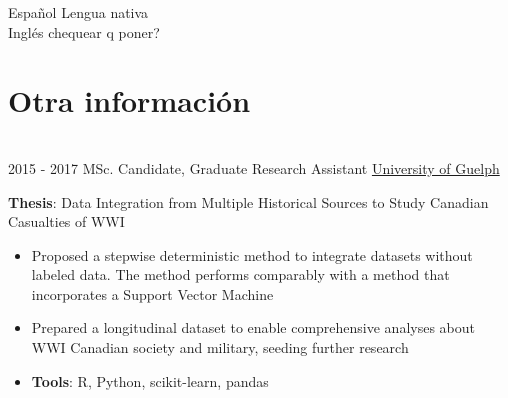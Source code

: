 \documentclass[letterpaper]{twentysecondcv} %
\begin{document}
\begin{twenty} %
\twentyitem
    	{Español}
		{}
        {Lengua nativa}
        {}
        {}
        {}
        \\
	\twentyitem
    	{Inglés}
		{}
        {chequear q poner?}
        {}
        {}
        {}


\end{twenty}
\section{Otra información}
\begin{twenty}
	\twentyitem
    	{}
		{}
        {}
        {}
        {}
        {}
         \\
	\twentyitem
    	{2015 -}
		{2017}
        {MSc. Candidate, Graduate Research Assistant}
        {\href{http://www.uoguelph.ca/}{University of Guelph}}
        {}
        {
       	\textbf{Thesis}: Data Integration from Multiple Historical Sources to Study Canadian Casualties of WWI
        {\begin{itemize}
        \item Proposed a stepwise deterministic method to integrate datasets without labeled data. The method performs comparably with a method that incorporates a Support Vector Machine
        \item Prepared a longitudinal dataset to enable comprehensive analyses about WWI Canadian society and military, seeding further research
        \item \textbf{Tools}: R, Python, scikit-learn, pandas \vspace{2mm}
		\end{itemize}}
        }
\end{twenty}
\end{document}
